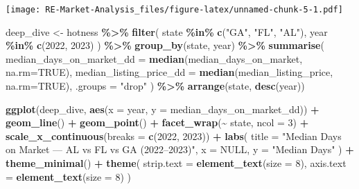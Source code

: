 \documentclass[
]{article}
\newenvironment{Shaded}{\begin{snugshade}}{\end{snugshade}}
\newcommand{\AttributeTok}[1]{\textcolor[rgb]{0.13,0.29,0.53}{#1}}
\newcommand{\ConstantTok}[1]{\textcolor[rgb]{0.56,0.35,0.01}{#1}}
\newcommand{\DecValTok}[1]{\textcolor[rgb]{0.00,0.00,0.81}{#1}}
\newcommand{\FunctionTok}[1]{\textcolor[rgb]{0.13,0.29,0.53}{\textbf{#1}}}
\newcommand{\NormalTok}[1]{#1}
\newcommand{\OtherTok}[1]{\textcolor[rgb]{0.56,0.35,0.01}{#1}}
\newcommand{\SpecialCharTok}[1]{\textcolor[rgb]{0.81,0.36,0.00}{\textbf{#1}}}
\newcommand{\StringTok}[1]{\textcolor[rgb]{0.31,0.60,0.02}{#1}}
\begin{document}
\texttt{[image: RE-Market-Analysis\_files/figure-latex/unnamed-chunk-5-1.pdf]}

\begin{Shaded}
\begin{Highlighting}[]
\NormalTok{deep\_dive }\OtherTok{\textless{}{-}}\NormalTok{ hotness }\SpecialCharTok{\%\textgreater{}\%}
  \FunctionTok{filter}\NormalTok{(}
\NormalTok{    state }\SpecialCharTok{\%in\%} \FunctionTok{c}\NormalTok{(}\StringTok{"GA"}\NormalTok{, }\StringTok{"FL"}\NormalTok{, }\StringTok{"AL"}\NormalTok{),}
\NormalTok{    year }\SpecialCharTok{\%in\%} \FunctionTok{c}\NormalTok{(}\DecValTok{2022}\NormalTok{, }\DecValTok{2023}\NormalTok{)}
\NormalTok{  ) }\SpecialCharTok{\%\textgreater{}\%}
  \FunctionTok{group\_by}\NormalTok{(state, year) }\SpecialCharTok{\%\textgreater{}\%}
  \FunctionTok{summarise}\NormalTok{(}
    \AttributeTok{median\_days\_on\_market\_dd =} \FunctionTok{median}\NormalTok{(median\_days\_on\_market, }\AttributeTok{na.rm=}\ConstantTok{TRUE}\NormalTok{),}
    \AttributeTok{median\_listing\_price\_dd =} \FunctionTok{median}\NormalTok{(median\_listing\_price, }\AttributeTok{na.rm=}\ConstantTok{TRUE}\NormalTok{),}
    \AttributeTok{.groups =} \StringTok{"drop"}
\NormalTok{  ) }\SpecialCharTok{\%\textgreater{}\%}
  \FunctionTok{arrange}\NormalTok{(state, }\FunctionTok{desc}\NormalTok{(year))}
\end{Highlighting}
\end{Shaded}

\begin{Shaded}
\begin{Highlighting}[]
\FunctionTok{ggplot}\NormalTok{(deep\_dive, }\FunctionTok{aes}\NormalTok{(}\AttributeTok{x =}\NormalTok{ year, }\AttributeTok{y =}\NormalTok{ median\_days\_on\_market\_dd)) }\SpecialCharTok{+}
  \FunctionTok{geom\_line}\NormalTok{() }\SpecialCharTok{+}
  \FunctionTok{geom\_point}\NormalTok{() }\SpecialCharTok{+}
  \FunctionTok{facet\_wrap}\NormalTok{(}\SpecialCharTok{\textasciitilde{}}\NormalTok{ state, }\AttributeTok{ncol =} \DecValTok{3}\NormalTok{) }\SpecialCharTok{+}
  \FunctionTok{scale\_x\_continuous}\NormalTok{(}\AttributeTok{breaks =} \FunctionTok{c}\NormalTok{(}\DecValTok{2022}\NormalTok{, }\DecValTok{2023}\NormalTok{)) }\SpecialCharTok{+}
  \FunctionTok{labs}\NormalTok{(}
    \AttributeTok{title =} \StringTok{"Median Days on Market — AL vs FL vs GA (2022–2023)"}\NormalTok{,}
    \AttributeTok{x =} \ConstantTok{NULL}\NormalTok{, }\AttributeTok{y =} \StringTok{"Median Days"}
\NormalTok{  ) }\SpecialCharTok{+}
  \FunctionTok{theme\_minimal}\NormalTok{() }\SpecialCharTok{+}
  \FunctionTok{theme}\NormalTok{(}
    \AttributeTok{strip.text =} \FunctionTok{element\_text}\NormalTok{(}\AttributeTok{size =} \DecValTok{8}\NormalTok{),}
    \AttributeTok{axis.text =} \FunctionTok{element\_text}\NormalTok{(}\AttributeTok{size =} \DecValTok{8}\NormalTok{)}
\NormalTok{  )}
\end{Highlighting}
\end{Shaded}
\end{document}
